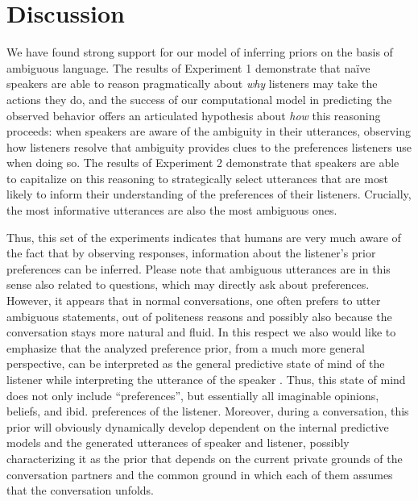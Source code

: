 \documentclass[10pt,a4paper]{article}
\begin{document}
\section{Discussion}

We have found strong support for our model of inferring priors on the basis of ambiguous language.
The results of Experiment 1 demonstrate that na\"ive speakers are able to reason pragmatically about \emph{why} listeners may take the actions they do, and the success of our computational model in predicting the observed behavior offers an articulated hypothesis about \emph{how} this reasoning proceeds: when speakers are aware of the ambiguity in their utterances, observing how listeners resolve that ambiguity provides clues to the preferences listeners use when doing so.
The results of Experiment 2 demonstrate that speakers are able to capitalize on this reasoning to strategically select utterances that are most likely to inform their understanding of the preferences of their listeners.
Crucially, the most informative utterances are also the most ambiguous ones.

Thus, this set of the experiments indicates that humans are very much aware of the fact that by observing responses, information about the listener's prior preferences can be inferred. 
Please note that ambiguous utterances are in this sense also related to questions, which may directly ask about preferences. 
However, it appears that in normal conversations, one often prefers to utter ambiguous statements, out of politeness reasons and possibly also because the conversation stays more natural and fluid.  
In this respect we also would like to emphasize that the analyzed preference prior, from a much more general perspective, can be interpreted as the general predictive state of mind of the listener while interpreting the utterance of the speaker \cite{Butz:2017}. 
Thus, this state of mind does not only include ``preferences'', but essentially all imaginable opinions, beliefs, and ibid. preferences of the listener. 
Moreover, during a conversation, this prior will obviously dynamically develop dependent on the internal predictive models and the generated utterances of speaker and listener, possibly characterizing it as the prior that depends on the current private grounds of the conversation partners and the common ground in which each of them assumes that the conversation unfolds. 




\setlength{\bibleftmargin}{.125in}
\setlength{\bibindent}{-\bibleftmargin}


\end{document}

